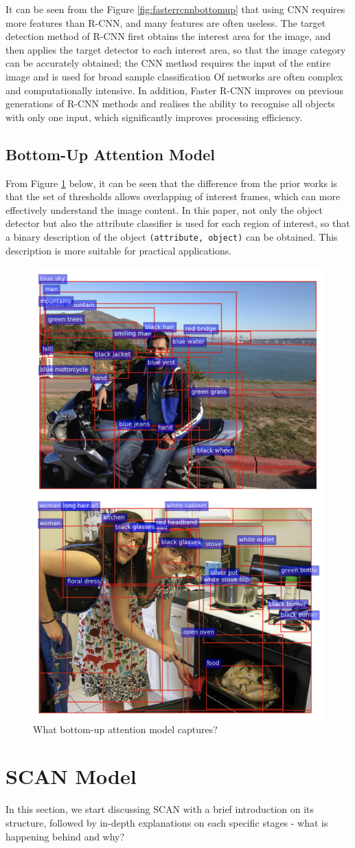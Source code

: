 It can be seen from the Figure \ref{fig:fasterrcnnbottomup} that using CNN requires more features than R-CNN, and many features are often useless. The target detection method of R-CNN first obtains the interest area for the image, and then applies the target detector to each interest area, so that the image category can be accurately obtained; the CNN method requires the input of the entire image and is used for broad sample classification Of networks are often complex and computationally intensive. In addition, Faster R-CNN improves on previous generations of R-CNN methods and realises the ability to recognise all objects with only one input, which significantly improves processing efficiency.

\subsection{Bottom-Up Attention Model}

From Figure \ref{fig:bottomup} below, it can be seen that the difference from the prior works is that the set of thresholds allows overlapping of interest frames, which can more effectively understand the image content. In this paper, not only the object detector but also the attribute classifier is used for each region of interest, so that a binary description of the object \verb|(attribute, object)| can be obtained. This description is more suitable for practical applications.

\begin{figure}[h!]
\centering
\includegraphics[width=.35\textwidth]{bottomup.pdf}
\caption{What bottom-up attention model captures? \cite{bottomup}}
\label{fig:bottomup}
\end{figure}

\section{SCAN Model}
In this section, we start discussing SCAN with a brief introduction on its structure, followed by in-depth explanations on each specific stages - what is happening behind and why?

